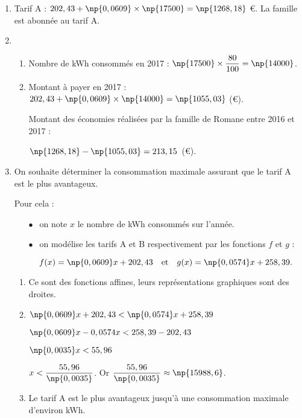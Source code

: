
\medskip

\begin{enumerate}
\item Tarif A : $202,43 + \np{0,0609} \times \np{17500} = \np{1268,18}$ €. La famille est abonnée au tarif A.
\item 
	\begin{enumerate}
		\item Nombre de kWh consommés en 2017 : $\np{17500} \times  \dfrac{80}{100} = \np{14000}$.
		\item Montant à payer en 2017 : $202,43 + \np{0,0609} \times \np{14000} = \np{1055,03}$ (\euro).
		
Montant des économies réalisées par la famille de Romane entre 2016 et 2017 : 
		
		$\np{1268,18} - \np{1055,03} = 213,15$~(\euro).
	\end{enumerate}
\item  On souhaite déterminer la consommation maximale assurant que le tarif A est le plus avantageux.
	
Pour cela :

\setlength\parindent{1cm}
\begin{itemize}
\item[$\bullet~~$] on note $x$ le nombre de kWh consommés sur l'année.
\item[$\bullet~~$] on modélise les tarifs A et B respectivement par les fonctions $f$ et $g$ :

\[f(x) = \np{0,0609}x + 202,43\quad  \text{et}\quad  g(x) = \np{0,0574}x + 258,39.\]

\end{itemize}
\setlength\parindent{0cm}
	\begin{enumerate}
		\item Ce sont des fonctions affines, leurs représentations graphiques sont des droites.
		\item $\np{0,0609}x + 202,43 < \np{0,0574}x + 258,39$
		
$\np{0,0609}x - 0,0574x < 258,39 - 202,43$
		
$\np{0,0035}x < 55,96$

$x < \dfrac{55,96}{\np{0,0035}}$. Or $\dfrac{55,96}{\np{0,0035}} \approx \np{15988,6}$.
		\item Le tarif A est le plus avantageux jusqu'à une consommation maximale d'environ kWh.
	\end{enumerate}
\end{enumerate}

\vspace{0,5cm}

